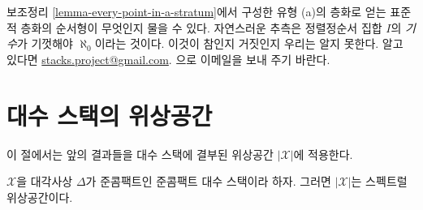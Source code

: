 \begin{remark}
\label{remark-order-type}
보조정리 \ref{lemma-every-point-in-a-stratum}에서 구성한 유형 (a)의
층화로 얻는 표준적 층화의 순서형이 무엇인지 물을 수 있다. 자연스러운
추측은 정렬정순서 집합 $I$의 {\it 기수}가 기껏해야 $\aleph_0$이라는
것이다. 이것이 참인지 거짓인지 우리는 알지 못한다. 알고 있다면
\href{mailto:stacks.project@gmail.com}{stacks.project@gmail.com}.
으로 이메일을 보내 주기 바란다.
\end{remark}







\section{대수 스택의 위상공간}
\label{section-topology}

\noindent
이 절에서는 앞의 결과들을 대수 스택에 결부된 위상공간
$|\mathcal{X}|$에 적용한다.

\begin{lemma}
\label{lemma-spectral-qc-diagonal-qc}
$\mathcal{X}$을 대각사상 $\Delta$가 준콤팩트인 준콤팩트 대수 스택이라
하자. 그러면 $|\mathcal{X}|$는 스펙트럴 위상공간이다.
\end{lemma}

